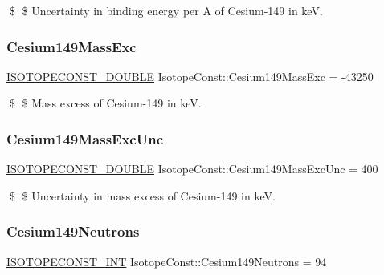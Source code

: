 \$ \$ Uncertainty in binding energy per A of Cesium-\/149 in keV. \mbox{\label{group___isotope_const-_cesium-_cs149_ga9255f37023aeae9eca0820997b2c817f}} 
\subsubsection{\texorpdfstring{Cesium149\+Mass\+Exc}{Cesium149MassExc}}
{\footnotesize\ttfamily \mbox{\hyperlink{group___isotope_const-_macros_ga8f45a7272ce02c0b4c65c44636ed719a}{I\+S\+O\+T\+O\+P\+E\+C\+O\+N\+S\+T\+\_\+\+D\+O\+U\+B\+LE}} Isotope\+Const\+::\+Cesium149\+Mass\+Exc = -\/43250}

\$ \$ Mass excess of Cesium-\/149 in keV. \mbox{\label{group___isotope_const-_cesium-_cs149_gad234022f90d9f4f5a47318df249fb69b}} 
\subsubsection{\texorpdfstring{Cesium149\+Mass\+Exc\+Unc}{Cesium149MassExcUnc}}
{\footnotesize\ttfamily \mbox{\hyperlink{group___isotope_const-_macros_ga8f45a7272ce02c0b4c65c44636ed719a}{I\+S\+O\+T\+O\+P\+E\+C\+O\+N\+S\+T\+\_\+\+D\+O\+U\+B\+LE}} Isotope\+Const\+::\+Cesium149\+Mass\+Exc\+Unc = 400}

\$ \$ Uncertainty in mass excess of Cesium-\/149 in keV. \mbox{\label{group___isotope_const-_cesium-_cs149_ga9934aeb56bec517cf2a4f50b1bb4ccd0}} 
\subsubsection{\texorpdfstring{Cesium149\+Neutrons}{Cesium149Neutrons}}
{\footnotesize\ttfamily \mbox{\hyperlink{group___isotope_const-_macros_ga5f18360b3e99483a35c32d789e62621c}{I\+S\+O\+T\+O\+P\+E\+C\+O\+N\+S\+T\+\_\+\+I\+NT}} Isotope\+Const\+::\+Cesium149\+Neutrons = 94}

